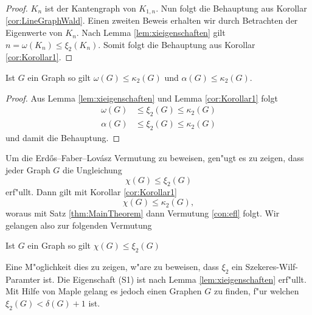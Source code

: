 \begin{proof}
  $K_n$ ist der Kantengraph von $K_{1,n}$. Nun folgt die Behauptung aus Korollar \ref{cor:LineGraphWald}.
  Einen zweiten Beweis erhalten wir durch Betrachten der Eigenwerte von $K_n$. Nach Lemma \ref{lem:xieigenschaften} gilt $n = \omega(K_n) \leq \xi_{2}(K_n)$. Somit folgt die Behauptung aus Korollar \ref{cor:Korollar1}.
\end{proof}

\begin{corollary}
  Ist $G$ ein Graph so gilt $\omega\left( G \right)\leq \kappa_{2}\left( G \right)$ und $\alpha\left( G \right)\leq \kappa_{2}\left( G \right)$.
  \label{cor:alphaomegakrausz}
\end{corollary}

\begin{proof}
  Aus Lemma \ref{lem:xieigenschaften} und Lemma \ref{cor:Korollar1} folgt
  \begin{align*}
    \omega(G) &\leq \xi_{2}(G) \leq \kappa_{2}(G) \\
    \alpha(G) &\leq \xi_{2}(G) \leq \kappa_{2}(G) 
  \end{align*}
  und damit die Behauptung.
\end{proof}

Um die Erd\H{o}s--Faber--Lov\'asz Vermutung zu beweisen, gen"ugt es zu zeigen, dass jeder Graph $G$ die Ungleichung $$\chi(G) \leq \xi_{2}(G)$$ erf"ullt. Dann gilt mit Korollar \ref{cor:Korollar1} $$\chi(G) \leq \kappa_{2}(G),$$  woraus mit Satz \ref{thm:MainTheorem} dann Vermutung \ref{con:efl} folgt. Wir gelangen also zur folgenden Vermutung
\begin{conjecture}
  Ist $G$ ein Graph so gilt $\chi(G) \leq \xi_{2}(G)$
  \label{con:maincon}
\end{conjecture}

Eine M"oglichkeit dies zu zeigen, w"are zu beweisen, dass $\xi_2$ ein Szekeres-Wilf-Paramter ist. Die Eigenschaft (S1) ist nach Lemma \ref{lem:xieigenschaften} erf"ullt. Mit Hilfe von Maple gelang es jedoch einen Graphen $G$ zu finden, f"ur welchen $\xi_{2}(G) < \delta(G) + 1$ ist. 

